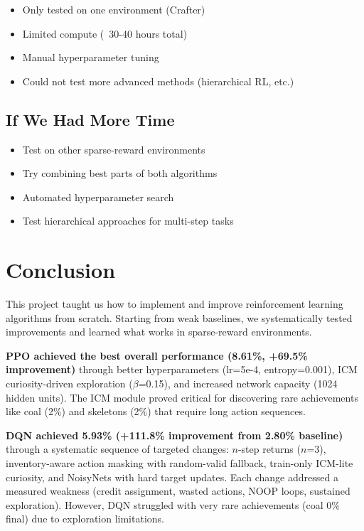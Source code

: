 \documentclass[conference]{IEEEtran}
\begin{document}
\begin{itemize}
    \item Only tested on one environment (Crafter)
    \item Limited compute (~30-40 hours total)
    \item Manual hyperparameter tuning
    \item Could not test more advanced methods (hierarchical RL, etc.)
\end{itemize}

\subsection{If We Had More Time}

\begin{itemize}
    \item Test on other sparse-reward environments
    \item Try combining best parts of both algorithms
    \item Automated hyperparameter search
    \item Test hierarchical approaches for multi-step tasks
\end{itemize}

\section{Conclusion}

This project taught us how to implement and improve reinforcement learning algorithms from scratch. Starting from weak baselines, we systematically tested improvements and learned what works in sparse-reward environments.

\textbf{PPO achieved the best overall performance (8.61\%, +69.5\% improvement)} through better hyperparameters (lr=5e-4, entropy=0.001), ICM curiosity-driven exploration ($\beta$=0.15), and increased network capacity (1024 hidden units). The ICM module proved critical for discovering rare achievements like coal (2\%) and skeletons (2\%) that require long action sequences.

\textbf{DQN achieved 5.93\% (+111.8\% improvement from 2.80\% baseline)} through a systematic sequence of targeted changes: $n$-step returns ($n$=3), inventory-aware action masking with random-valid fallback, train-only ICM-lite curiosity, and NoisyNets with hard target updates. Each change addressed a measured weakness (credit assignment, wasted actions, NOOP loops, sustained exploration). However, DQN struggled with very rare achievements (coal 0\% final) due to exploration limitations.
\end{document}
